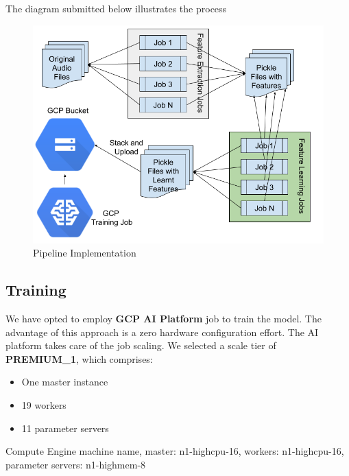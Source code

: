 The diagram submitted below illustrates the process

\begin{Schunk}
\begin{figure}[H]

{\centering \includegraphics[width=1\linewidth]{../images/PipelineImplementation} 

}

\caption[Pipeline Implementation]{Pipeline Implementation}\label{fig:impl}
\end{figure}
\end{Schunk}

\hypertarget{training}{%
\subsection{Training}\label{training}}

We have opted to employ \textbf{GCP AI Platform} job to train the model.
The advantage of this approach is a zero hardware configuration effort.
The AI platform takes care of the job scaling. We selected a scale tier
of \textbf{PREMIUM\_1}, which comprises:

\begin{itemize}
\tightlist
\item
  One master instance
\item
  19 workers
\item
  11 parameter servers
\end{itemize}

Compute Engine machine name, master: n1-highcpu-16, workers:
n1-highcpu-16, parameter servers: n1-highmem-8

